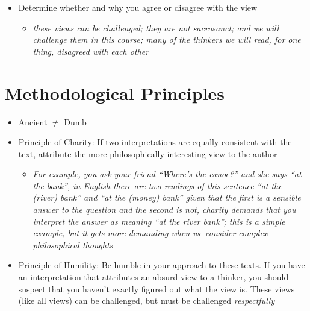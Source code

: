 \documentclass[11pt]{article}
\begin{document}
\begin{itemize}
\item{Determine whether and why you agree or disagree with the view}\begin{itemize}\item{\emph{these views can be challenged; they are not sacrosanct; and we will challenge them in this course; many of the thinkers we will read, for one thing, disagreed with each other}}\end{itemize}
\end{itemize}

\section*{Methodological Principles}

\begin{itemize} 
\item{Ancient $\neq$ Dumb}
\item{Principle of Charity: If two interpretations are equally consistent with the text, attribute the more philosophically interesting view to the author}\begin{itemize}\item{\emph{For example, you ask your friend ``Where's the canoe?'' and she says ``at the bank'', in English there are two readings of this sentence ``at the (river) bank'' and ``at the (money) bank'' given that the first is a sensible answer to the question and the second is not, charity demands that you interpret the answer as meaning ``at the river bank''; this is a simple example, but it gets more demanding when we consider complex philosophical thoughts}}\end{itemize}
\item{Principle of Humility: Be humble in your approach to these texts. If you have an interpretation that attributes an absurd view to a thinker, you should suspect that you haven't exactly figured out what the view is. These views (like all views) can be challenged, but must be challenged \emph{respectfully}}
\end{itemize}
\end{document}
